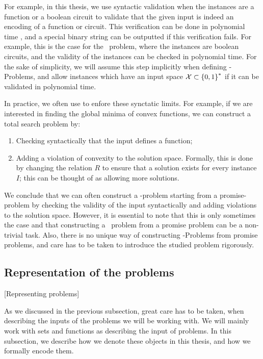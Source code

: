 For example, in this thesis, we use syntactic validation when the instances are a function or a boolean circuit to validate that the given input is indeed an encoding of a function or circuit. This verification can be done in polynomial time , and a special binary string can be outputted if this verification fails. For example, this is the case for the \Tarski\ problem, where the instances are boolean circuits, and the validity of the instances can be checked in polynomial time. For the sake of simplicity, we will assume this step implicitly when defining \TFNP-Problems, and allow instances which have an input space $\mathcal{X} \subset \left\{0, 1\right\}^*$ if it can be validated in polynomial time.

In practice, we often use  to enfore these synctatic limits. For example, if we are interested in finding the global minima of convex functions, we can construct a total search problem by:
\begin{enumerate}
	\item Checking syntactically that the input defines a function;
	\item Adding a violation of convexity to the solution space. Formally, this is done by changing the relation $R$ to ensure that a solution exists for every instance $I$; this can be thought of as allowing more solutions.
\end{enumerate}

We conclude that we can often construct a \TFNP-problem starting from a promise-problem by checking the validity of the input syntactically and adding violations to the solution space. However, it is essential to note that this is only sometimes the case and that constructing a \TFNP\ problem from a promise problem can be a non-trivial task. Also, there is no unique way of constructing \TFNP-Problems from promise problems, and care has to be taken to introduce the studied problem rigorously.

\subsection{Representation of the problems}[Representing problems]

As we discussed in the previous subsection, great care has to be taken, when describing the inputs of the problems we will be working with. We will mainly work with sets and functions as describing the input of problems. In this subsection, we describe how we denote these objects in this thesis, and how we formally encode them.


